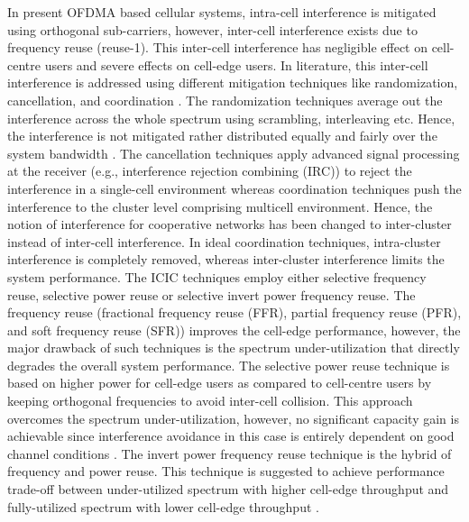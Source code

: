 \documentclass[article,10pt,twocolumn]{IEEEtran}
\begin{document}
In present OFDMA based cellular systems, intra-cell interference is mitigated using orthogonal sub-carriers, however, inter-cell interference exists due to frequency reuse (reuse-1). This inter-cell interference has negligible effect on cell-centre users and severe effects on cell-edge users. In literature, this inter-cell interference is addressed using different mitigation techniques like randomization, cancellation, and coordination \citep{5441362}. The randomization techniques average out the interference across the whole spectrum using scrambling, interleaving etc. Hence, the interference is not mitigated rather distributed equally and fairly over the system bandwidth \citep{6392819}. The cancellation techniques apply advanced signal processing at the receiver (e.g., interference rejection combining (IRC)) to reject the interference in a single-cell environment whereas coordination techniques push the interference to the cluster level comprising multicell environment. Hence, the notion of interference for cooperative networks has been changed to inter-cluster instead of inter-cell interference. In ideal coordination techniques, intra-cluster interference is completely removed, whereas inter-cluster interference limits the system performance. The ICIC techniques employ either selective frequency reuse, selective power reuse or selective invert power frequency reuse. The frequency reuse (fractional frequency reuse (FFR), partial frequency reuse (PFR), and soft frequency reuse (SFR)) improves the cell-edge performance, however, the major drawback of such techniques is the spectrum under-utilization that directly degrades the overall system performance. The selective power reuse technique is based on higher power for cell-edge users as compared to cell-centre users by keeping orthogonal frequencies to avoid inter-cell collision. This approach overcomes the spectrum under-utilization, however, no significant capacity gain is achievable since interference avoidance in this case is entirely dependent on good channel conditions \citep{4907410}. The invert power frequency reuse technique is the hybrid of frequency and power reuse. This technique is suggested to achieve performance trade-off between under-utilized spectrum with higher cell-edge throughput and fully-utilized spectrum with lower cell-edge throughput \citep{5506110,5450256}.
\end{document}
